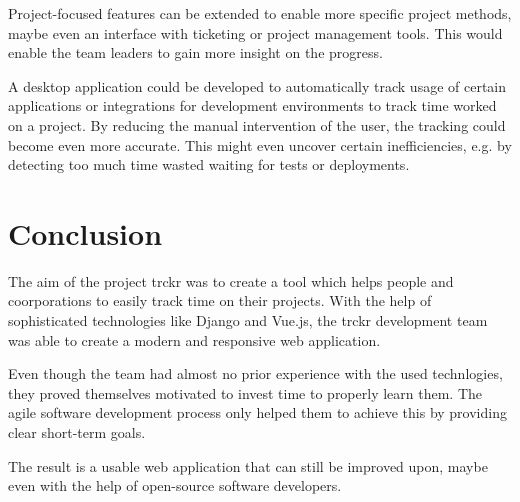 \documentclass[bibliography=totoc, listof=totocnumbered]{scrartcl}
\begin{document}
Project-focused features can be extended to enable more specific project
methods, maybe even an interface with ticketing or project management tools.
This would enable the team leaders to gain more insight on the progress.

A desktop application could be developed to automatically track usage of certain
applications or integrations for development environments to track time worked
on a project. By reducing the manual intervention of the user, the tracking
could become even more accurate. This might even uncover certain inefficiencies,
e.g. by detecting too much time wasted waiting for tests or deployments.

\section{Conclusion}
The aim of the project trckr was to create a tool which helps people and
coorporations to easily track time on their projects. With the help of
sophisticated technologies like Django and Vue.js, the trckr development
team was able to create a modern and responsive web application.

Even though the team had almost no prior experience with the used technlogies,
they proved themselves motivated to invest time to properly learn them. The
agile software development process only helped them to achieve this by providing
clear short-term goals.

The result is a usable web application that can still be improved upon, maybe
even with the help of open-source software developers.

\clearpage
\printbibliography
\end{document}
